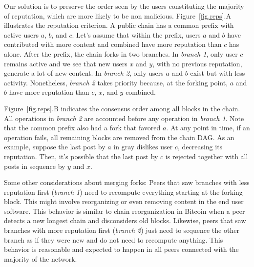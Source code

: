 \documentclass[10pt,journal,compsoc]{IEEEtran}
\newcommand{\reps} {\emph{reps}\xspace}
\begin{document}
Our solution is to preserve the order seen by the users constituting the
majority of reputation, which are more likely to be non malicious.
%
Figure~\ref{fig.reps}.A illustrates the reputation criterion.
A public chain has a common prefix with active users $a$, $b$, and $c$.
Let's assume that within the prefix, users $a$ and $b$ have contributed with
more content and combined have more reputation than $c$ has alone.
%
After the prefix, the chain forks in two branches.
In \emph{branch 1}, only user $c$ remains active and we see that new users $x$
and $y$, with no previous reputation, generate a lot of new content.
In \emph{branch 2}, only users $a$ and $b$ exist but with less activity.
Nonetheless, \emph{branch 2} takes priority because, at the forking point, $a$
and $b$ have more reputation than $c$, $x$, and $y$ combined.

Figure~\ref{fig.reps}.B indicates the consensus order among all blocks in the
chain.
All operations in \emph{branch 2} are accounted before any operation in
\emph{branch 1}.
Note that the common prefix also had a fork that favored $a$.
At any point in time, if an operation fails, all remaining blocks are removed
from the chain DAG.
As an example, suppose the last post by $a$ in gray dislikes user $c$,
decreasing its reputation.
Then, it's possible that the last post by $c$ is rejected together with all
posts in sequence by $y$ and $x$.

Some other considerations about merging forks:
Peers that saw branches with less reputation first (\emph{branch 1}) need to
recompute everything starting at the forking block.
This might involve reorganizing or even removing content in the end user
software.
This behavior is similar to chain reorganization in Bitcoin when a peer detects
a new longest chain and disconsiders old blocks.
%
Likewise, peers that saw branches with more reputation first (\emph{branch 2})
just need to sequence the other branch as if they were new and do not need to
recompute anything.
This behavior is reasonable and expected to happen in all peers connected with
the majority of the network.

\end{document}

